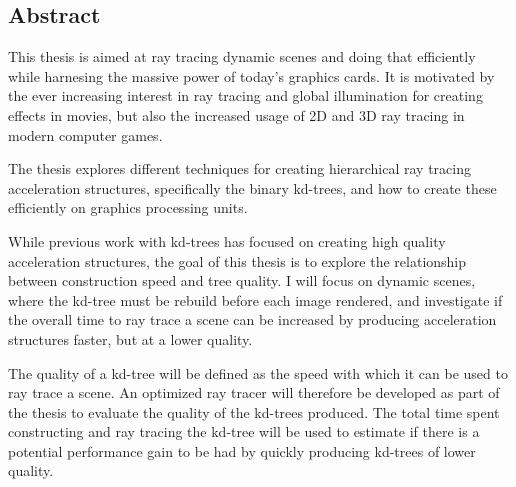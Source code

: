 
\begin{center}
\begin{minipage}{0.7\textwidth}
\vspace{6cm}

\section*{Abstract}

This thesis is aimed at ray tracing dynamic scenes and doing that efficiently
while harnesing the massive power of today's graphics cards. It is motivated by
the ever increasing interest in ray tracing and global illumination for creating
effects in movies, but also the increased usage of 2D and 3D ray tracing in
modern computer games.

The thesis explores different techniques for creating hierarchical ray tracing
acceleration structures, specifically the binary kd-trees, and how to create
these efficiently on graphics processing units.

While previous work with kd-trees has focused on creating high quality
acceleration structures, the goal of this thesis is to explore the relationship
between construction speed and tree quality. I will focus on dynamic scenes,
where the kd-tree must be rebuild before each image rendered, and investigate if
the overall time to ray trace a scene can be increased by producing acceleration
structures faster, but at a lower quality.

The quality of a kd-tree will be defined as the speed with which it can be used
to ray trace a scene. An optimized ray tracer will therefore be developed as
part of the thesis to evaluate the quality of the kd-trees produced. The total
time spent constructing and ray tracing the kd-tree will be used to estimate if
there is a potential performance gain to be had by quickly producing kd-trees of
lower quality.

\end{minipage}
\end{center}


